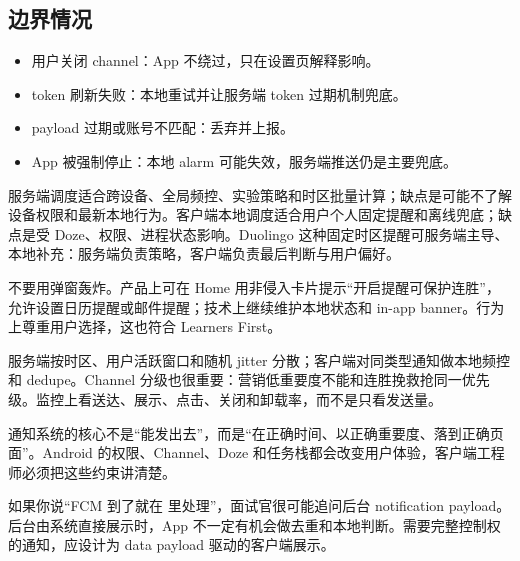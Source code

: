 \subsection{边界情况}

\begin{itemize}
  \item 用户关闭 channel：App 不绕过，只在设置页解释影响。
  \item token 刷新失败：本地重试并让服务端 token 过期机制兜底。
  \item payload 过期或账号不匹配：丢弃并上报。
  \item App 被强制停止：本地 alarm 可能失效，服务端推送仍是主要兜底。
\end{itemize}

\begin{followup}[“服务端调度和客户端本地调度各自优缺点是什么？”]
服务端调度适合跨设备、全局频控、实验策略和时区批量计算；缺点是可能不了解设备权限和最新本地行为。客户端本地调度适合用户个人固定提醒和离线兜底；缺点是受 Doze、权限、进程状态影响。Duolingo 这种固定时区提醒可服务端主导、本地补充：服务端负责策略，客户端负责最后判断与用户偏好。
\end{followup}

\begin{followup}[“用户关闭通知权限后如何优雅降级？”]
不要用弹窗轰炸。产品上可在 Home 用非侵入卡片提示“开启提醒可保护连胜”，允许设置日历提醒或邮件提醒；技术上继续维护本地状态和 in-app banner。行为上尊重用户选择，这也符合 Learners First。
\end{followup}

\begin{followup}[“如何避免同一时刻推送风暴？”]
服务端按时区、用户活跃窗口和随机 jitter 分散；客户端对同类型通知做本地频控和 dedupe。Channel 分级也很重要：营销低重要度不能和连胜挽救抢同一优先级。监控上看送达、展示、点击、关闭和卸载率，而不是只看发送量。
\end{followup}

\begin{idea}
通知系统的核心不是“能发出去”，而是“在正确时间、以正确重要度、落到正确页面”。Android 的权限、Channel、Doze 和任务栈都会改变用户体验，客户端工程师必须把这些约束讲清楚。
\end{idea}

\begin{pitfall}
如果你说“FCM 到了就在  里处理”，面试官很可能追问后台 notification payload。后台由系统直接展示时，App 不一定有机会做去重和本地判断。需要完整控制权的通知，应设计为 data payload 驱动的客户端展示。
\end{pitfall}

